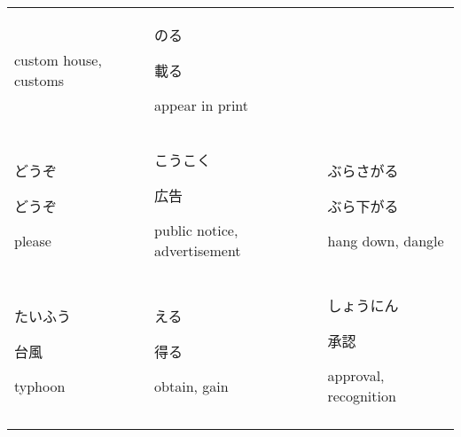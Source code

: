 \documentclass[12pt, a4j, landscape, dvipdfmx]{utarticle}
\begin{document}
\begin{minipage}[t][0pt]{\linewidth }
\begin{tabular}{||p{5.5cm}||p{5.5cm}||p{5.5cm}||}
\hspace*{.425cm} {\small custom house, customs}&\rule{0pt}{3ex} \hspace*{-.4cm} {\LARGE のる}\newline \rule{0pt}{3ex} \hspace*{.4cm} {\small 載る}\newline \rule{0pt}{3ex} \hspace*{.425cm} {\small appear in print}\tabularnewline \hhline{|:=::=::=:|} \rule{0pt}{3ex} \hspace*{-.4cm} {\LARGE どうぞ}\newline \rule{0pt}{3ex} \hspace*{.4cm} {\small どうぞ}\newline \rule{0pt}{3ex} \hspace*{.425cm} {\small please}&\rule{0pt}{3ex} \hspace*{-.4cm} {\LARGE こうこく}\newline \rule{0pt}{3ex} \hspace*{.4cm} {\small 広告}\newline \rule{0pt}{3ex} \hspace*{.425cm} {\small public notice, advertisement}&\rule{0pt}{3ex} \hspace*{-.4cm} {\LARGE ぶらさがる}\newline \rule{0pt}{3ex} \hspace*{.4cm} {\small ぶら下がる}\newline \rule{0pt}{3ex} \hspace*{.425cm} {\small hang down, dangle}\tabularnewline \hhline{|:=::=::=:|} \rule{0pt}{3ex} \hspace*{-.4cm} {\LARGE たいふう}\newline \rule{0pt}{3ex} \hspace*{.4cm} {\small 台風}\newline \rule{0pt}{3ex} \hspace*{.425cm} {\small typhoon}&\rule{0pt}{3ex} \hspace*{-.4cm} {\LARGE える}\newline \rule{0pt}{3ex} \hspace*{.4cm} {\small 得る}\newline \rule{0pt}{3ex} \hspace*{.425cm} {\small obtain, gain}&\rule{0pt}{3ex} \hspace*{-.4cm} {\LARGE しょうにん}\newline \rule{0pt}{3ex} \hspace*{.4cm} {\small 承認}\newline \rule{0pt}{3ex} \hspace*{.425cm} {\small approval, recognition}\tabularnewline \hhline{|b:=:b:=:b:=:b|} 
        \end{tabular} 
    \end{minipage} 
\end{document}

